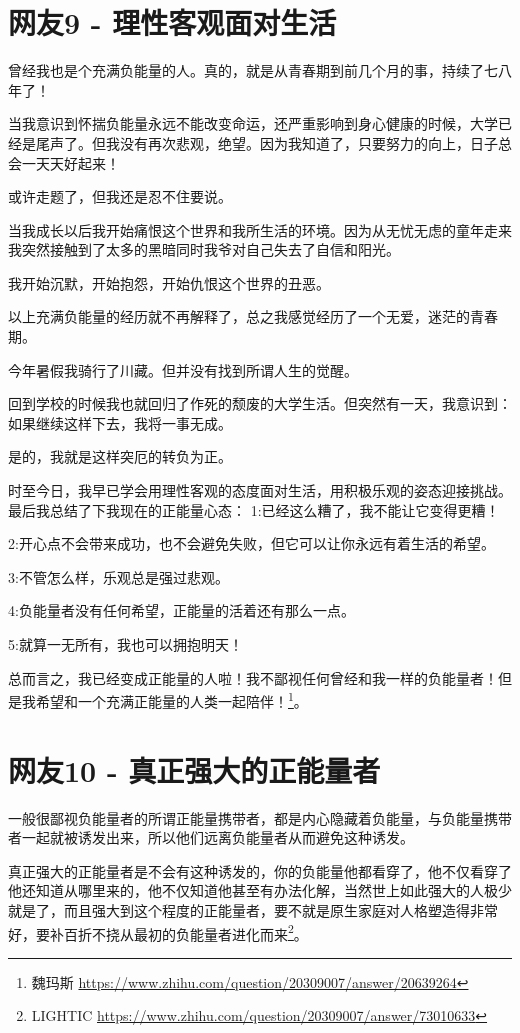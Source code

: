 \section{网友9 - 理性客观面对生活}

曾经我也是个充满负能量的人。真的，就是从青春期到前几个月的事，持续了七八年了！

当我意识到怀揣负能量永远不能改变命运，还严重影响到身心健康的时候，大学已经是尾声了。但我没有再次悲观，绝望。因为我知道了，只要努力的向上，日子总会一天天好起来！

或许走题了，但我还是忍不住要说。

当我成长以后我开始痛恨这个世界和我所生活的环境。因为从无忧无虑的童年走来我突然接触到了太多的黑暗同时我爷对自己失去了自信和阳光。

我开始沉默，开始抱怨，开始仇恨这个世界的丑恶。

以上充满负能量的经历就不再解释了，总之我感觉经历了一个无爱，迷茫的青春期。

今年暑假我骑行了川藏。但并没有找到所谓人生的觉醒。

回到学校的时候我也就回归了作死的颓废的大学生活。但突然有一天，我意识到：如果继续这样下去，我将一事无成。

是的，我就是这样突厄的转负为正。

时至今日，我早已学会用理性客观的态度面对生活，用积极乐观的姿态迎接挑战。
最后我总结了下我现在的正能量心态：
1:已经这么糟了，我不能让它变得更糟！

2:开心点不会带来成功，也不会避免失败，但它可以让你永远有着生活的希望。

3:不管怎么样，乐观总是强过悲观。

4:负能量者没有任何希望，正能量的活着还有那么一点。

5:就算一无所有，我也可以拥抱明天！

总而言之，我已经变成正能量的人啦！我不鄙视任何曾经和我一样的负能量者！但是我希望和一个充满正能量的人类一起陪伴！\footnote{魏玛斯 \quad \url{https://www.zhihu.com/question/20309007/answer/20639264}}。

\section{网友10 - 真正强大的正能量者}

一般很鄙视负能量者的所谓正能量携带者，都是内心隐藏着负能量，与负能量携带者一起就被诱发出来，所以他们远离负能量者从而避免这种诱发。 

真正强大的正能量者是不会有这种诱发的，你的负能量他都看穿了，他不仅看穿了他还知道从哪里来的，他不仅知道他甚至有办法化解，当然世上如此强大的人极少就是了，而且强大到这个程度的正能量者，要不就是原生家庭对人格塑造得非常好，要补百折不挠从最初的负能量者进化而来\footnote{LIGHTIC \quad \url{https://www.zhihu.com/question/20309007/answer/73010633}}。

